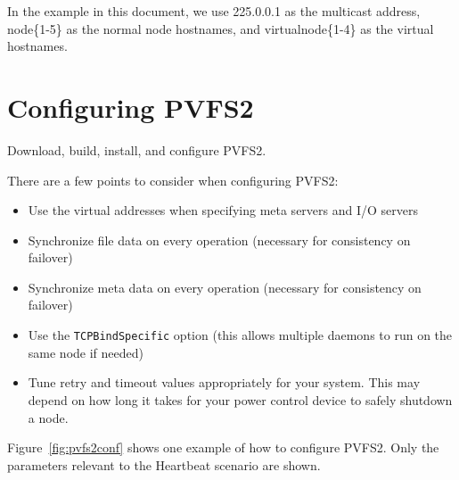 \documentclass[11pt]{article}
\begin{document}
In the example in this document, we use 225.0.0.1 as the multicast
address, node\{1-5\} as the normal node hostnames, and
virtualnode\{1-4\} as the virtual hostnames.

\section{Configuring PVFS2}

Download, build, install, and configure PVFS2.  

There are a few points to consider when configuring PVFS2:
\begin{itemize}
\item Use the virtual addresses when specifying meta servers and I/O
servers
\item Synchronize file data on every operation (necessary for consistency on
failover)
\item Synchronize meta data on every operation (necessary for consistency on
failover)
\item Use the \texttt{TCPBindSpecific} option (this allows multiple daemons to
run on the same node if needed)
\item Tune retry and timeout values appropriately for your system.  This
may depend on how long it takes for your power control device to safely
shutdown a node.
\end{itemize}

Figure~\ref{fig:pvfs2conf} shows one example of how to configure PVFS2.
Only the parameters relevant to the Heartbeat scenario are shown.
\end{document}
